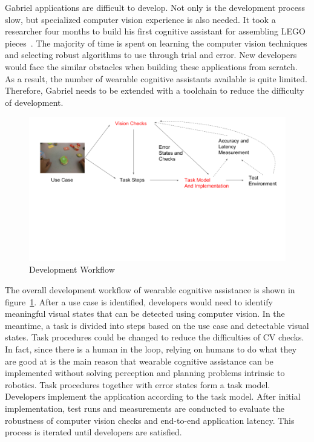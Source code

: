 Gabriel applications are difficult to develop. Not only is the development
process slow, but specialized computer vision experience is also needed. It took
a researcher four months to build his first cognitive assistant for assembling
LEGO pieces~\cite{chen2018application}. The majority of time is spent on
learning the computer vision techniques and selecting robust algorithms to use
through trial and error. New developers would face the similar obstacles when
building these applications from scratch. As a result, the number of wearable
cognitive assistants available is quite limited. Therefore, Gabriel needs to be
extended with a toolchain to reduce the difficulty of development.

\begin{figure}
  \centering
  \includegraphics[trim={0 10cm 0 0},width=\linewidth]{FIGS/ad-hoc-workflow}
  \hspace{-0.50in}
	\caption{Development Workflow}
    \vspace{-0.0in}
    \label{fig:workflow}
\end{figure}

The overall development workflow of wearable cognitive assistance is shown in
figure~\ref{fig:workflow}. After a use case is identified, developers would need
to identify meaningful visual states that can be detected using computer vision.
In the meantime, a task is divided into steps based on the use case and
detectable visual states. Task procedures could be changed to reduce the
difficulties of CV checks. In fact, since there is a human in the loop, relying
on humans to do what they are good at is the main reason that wearable cognitive
assistance can be implemented without solving perception and planning problems
intrinsic to robotics. Task procedures together with error states form a task
model. Developers implement the application according to the task model. After
 initial implementation, test runs and measurements are conducted to evaluate
the robustness of computer vision checks and end-to-end application latency.
This process is iterated until developers are satisfied.

